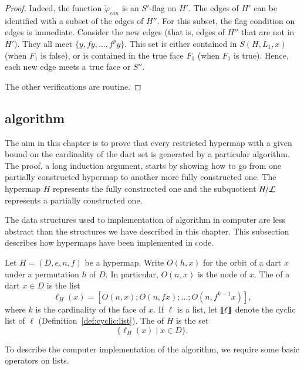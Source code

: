 \begin{proof}
   Indeed, the
function $\check\varphi_{can}$ is an $S'$-flag on $H'$.  The edges of
$H'$ can be identified with a subset of the edges of $H''$.  For this
subset, the flag condition on edges is immediate.  Consider the new
edges (that is, edges of $H''$ that are not in $H'$).  They all meet
$\{y,f y,\ldots,f^p y\}$.  This set is either contained in
$S(H,L_1,x)$ (when $F_1$ is false), or is contained in the true face
$F_1$ (when $F_1$ is true).  Hence, each new edge meets a true face or
$S''$.


The other verifications are routine.
\end{proof}


\subsection{algorithm}

The aim in this chapter is to prove that every restricted hypermap
with a given bound on the cardinality of the dart set is generated by
a particular algorithm.  The proof, a long induction argument, starts
by showing how to go from one partially constructed hypermap to
another more fully constructed one.  The hypermap $H$ represents the
fully constructed one and the subquotient $H/{\cal L}$ represents a
partially constructed one.

The data structures used to implementation of algorithm in computer
are less abstract than the structures we have described in this
chapter.  This subsection describes how hypermaps have been
implemented in code.


\begin{definition}[listing]
  Let $H=(D,e,n,f)$ be a hypermap.  Write $O(h,x)$ for the orbit of a
  dart $x$ under a permutation $h$ of $D$.  In particular, $O(n,x)$ is
  the node of $x$.  The  of a dart $x\in D$ is the
  list
\[
\ell_H(x) = [O(n,x);O(n,f x);\ldots;O(n,f^{k-1} x)   ], 
\]
where $k$ is the cardinality of the face of $x$.  If $\ell$ is a list,
let ${\llbracket{\ell}\rrbracket}$ denote the cyclic list of $\ell$
(Definition~\ref{def:cyclic:list}).  The  of $H$ is
the set
\[
\{\ell_H(x) \mid x\in D\}.
\]
\end{definition}

To describe the computer implementation of the algorithm, we require
some basic operators on lists.

